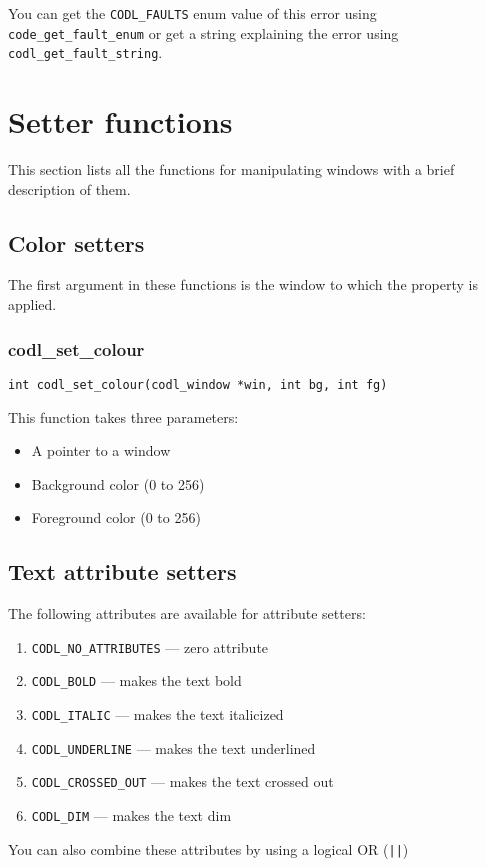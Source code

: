 \documentclass{article}
\newcommand{\fstep}{\vspace{3mm}\noindent}
\begin{document}
You can get the {\tt CODL\_FAULTS} enum value of this error using
{\tt code\_get\_fault\_enum} or get a string explaining the error using
{\tt codl\_get\_fault\_string}.

\section{Setter functions}
This section lists all the functions for manipulating windows with a brief
description of them.

\subsection{Color setters}

The first argument in these functions is the window to which the property is applied.

\subsubsection{codl\_set\_colour}
{\tt int codl\_set\_colour(codl\_window *win, int bg, int fg)}

\fstep{} This function takes three parameters:
\begin{itemize}
\item{A pointer to a window}
\item{Background color (0 to 256)}
\item{Foreground color (0 to 256)}
\end{itemize}

\subsection{Text attribute setters}
The following attributes are available for attribute setters:
\begin{enumerate}
\item{{\tt CODL\_NO\_ATTRIBUTES} --- zero attribute}
\item{{\tt CODL\_BOLD} --- makes the text bold}
\item{{\tt CODL\_ITALIC} --- makes the text italicized}
\item{{\tt CODL\_UNDERLINE} --- makes the text underlined}
\item{{\tt CODL\_CROSSED\_OUT} --- makes the text crossed out}
\item{{\tt CODL\_DIM} --- makes the text dim}  
\end{enumerate}

\noindent\vspace{3mm} You can also combine these attributes by using a logical OR ({\tt ||})
\end{document}
